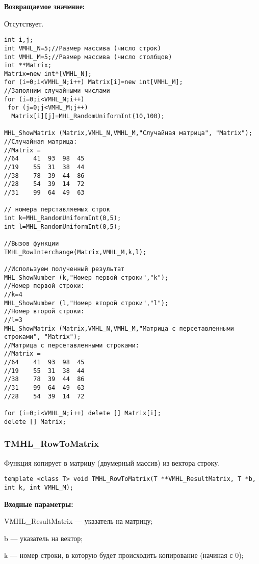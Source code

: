 \documentclass[a4paper,12pt]{article}
\begin{document}
\textbf{Возвращаемое значение:}

Отсутствует.


\begin{lstlisting}[label=code_use_TMHL_RowInterchange,caption=Пример использования]
int i,j;
int VMHL_N=5;//Размер массива (число строк)
int VMHL_M=5;//Размер массива (число столбцов)
int **Matrix;
Matrix=new int*[VMHL_N];
for (i=0;i<VMHL_N;i++) Matrix[i]=new int[VMHL_M];
//Заполним случайными числами
for (i=0;i<VMHL_N;i++)
 for (j=0;j<VMHL_M;j++)
  Matrix[i][j]=MHL_RandomUniformInt(10,100);

MHL_ShowMatrix (Matrix,VMHL_N,VMHL_M,"Случайная матрица", "Matrix");
//Случайная матрица:
//Matrix =	
//64	41	93	98	45
//19	55	31	38	44
//38	78	39	44	86
//28	54	39	14	72
//31	99	64	49	63

// номера перставляемых строк
int k=MHL_RandomUniformInt(0,5);
int l=MHL_RandomUniformInt(0,5);

//Вызов функции
TMHL_RowInterchange(Matrix,VMHL_M,k,l);

//Используем полученный результат
MHL_ShowNumber (k,"Номер первой строки","k");
//Номер первой строки:
//k=4
MHL_ShowNumber (l,"Номер второй строки","l");
//Номер второй строки:
//l=3
MHL_ShowMatrix (Matrix,VMHL_N,VMHL_M,"Матрица с персетавленными строками", "Matrix");
//Матрица с персетавленными строками:
//Matrix =	
//64	41	93	98	45
//19	55	31	38	44
//38	78	39	44	86
//31	99	64	49	63
//28	54	39	14	72

for (i=0;i<VMHL_N;i++) delete [] Matrix[i];
delete [] Matrix;
\end{lstlisting}

\subsubsection{TMHL\_RowToMatrix}\label{TMHL_RowToMatrix}

Функция копирует в матрицу (двумерный массив) из вектора строку.


\begin{lstlisting}[label=code_syntax_TMHL_RowToMatrix,caption=Синтаксис]
template <class T> void TMHL_RowToMatrix(T **VMHL_ResultMatrix, T *b, int k, int VMHL_M);
\end{lstlisting}

\textbf{Входные параметры:}  
 
VMHL\_ResultMatrix --- указатель на матрицу;
 
b --- указатель на вектор;
 
k --- номер строки, в которую будет происходить копирование (начиная с 0);
 
\end{document}
